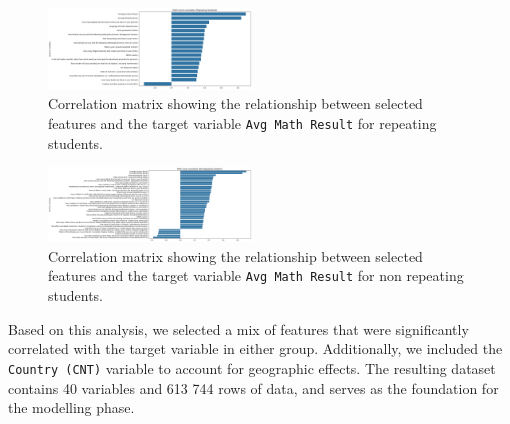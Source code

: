 \begin{figure}[H]
    \centering
    \includegraphics[width=0.48\textwidth]{figures/Q1_repratingcorrelations.png}
    \caption{Correlation matrix showing the relationship between selected features and the target variable \texttt{Avg Math Result} for repeating students.}
    \label{fig:correlation_chart_repeating}
\end{figure}


\begin{figure}[H]
    \centering
    \includegraphics[width=0.48\textwidth]{figures/Q1_nonrepeatingcorrelations.png}
    \caption{Correlation matrix showing the relationship between selected features and the target variable \texttt{Avg Math Result} for non repeating students.}
    \label{fig:correlation_chart_not_repeating}
\end{figure}


Based on this analysis, we selected a mix of features that were significantly correlated with the target variable in either group. Additionally, we included the \texttt{Country (CNT)} variable to account for geographic effects.
The resulting dataset contains 40 variables and 613 744 rows of data, and serves as the foundation for the modelling phase.
